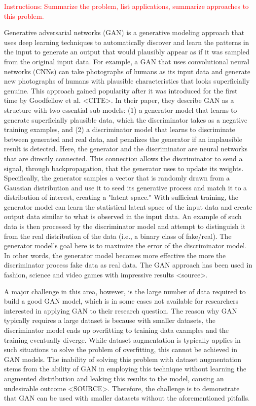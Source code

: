 \documentclass{report}
\begin{document}
\textcolor{red}{Instructions: Summarize the problem, list applications, summarize approaches to this problem.}


Generative adversarial networks (GAN) is a generative modeling approach that uses deep learning techniques to automatically discover and learn the patterns in the input to generate an output that would plausibly appear as if it was sampled from the original input data. For example, a GAN that uses convolutional neural networks (CNNs) can take photographs of humans as its input data and generate new photographs of humans with plausible characteristics that looks superficially genuine. This approach gained popularity after it was introduced for the first time by Goodfellow et al. <CITE>. In their paper, they describe GAN as a structure with two essential sub-models: (1) a generator model that learns to generate superficially plausible data, which the discriminator takes as a negative training examples, and (2) a discriminator model that learns to discriminate between generated and real data, and penalizes the generator if an implausible result is detected. Here, the generator and the discriminator are neural networks that are directly connected. This connection allows the discriminator to send a signal, through backpropagation, that the generator uses to update its weights. Specifically, the generator samples a vector that is randomly drawn from a Gaussian distribution and use it to seed its generative process and match it to a distribution of interest, creating a "latent space." With sufficient training, the generator model can learn the statistical latent space of the input data and create output data similar to what is observed in the input data. An example of such data is then processed by the discriminator model and attempt to distinguish it from the real distribution of the data (i.e., a binary class of fake/real). The generator model's goal here is to maximize the error of the discriminator model. In other words, the generator model becomes more effective the more the discriminator process fake data as real data. The GAN approach has been used in fashion, science and video games with impressive results <source>.

A major challenge in this area, however, is the large number of data required to build a good GAN model, which is in some cases not available for researchers interested in applying GAN to their research question. The reason why GAN typically requires a large dataset is because with smaller datasets, the discriminator model ends up overfitting to training data examples and the training eventually diverge. While dataset augmentation is typically applies in such situations to solve the problem of overfitting, this cannot be achieved in GAN models. The inability of solving this problem with dataset augmentation stems from the ability of GAN in employing this technique without learning the augmented distribution and leaking this results to the model, causing an undesirable outcome <SOURCE>. Therefore, the challenge is to demonstrate that GAN can be used with smaller datasets without the aforementioned pitfalls.
\end{document}
